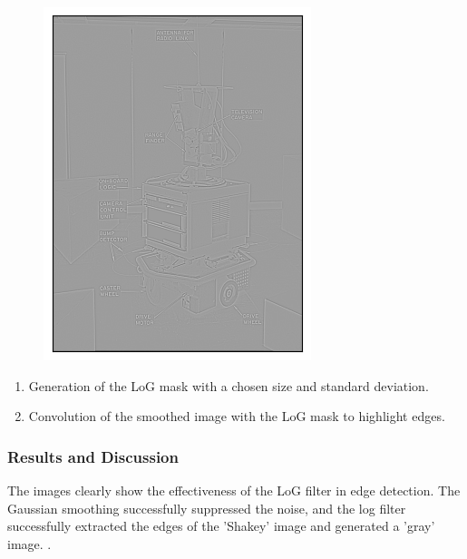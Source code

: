 \documentclass[11pt]{article}
\begin{document}
\begin{figure}[h]
\begin{minipage}{0.3\textwidth}
        \includegraphics[width=\textwidth]{../img/shakey_log_no_threshold.png}
    \end{minipage}\hfill
\end{figure}

\begin{enumerate}
    \item Generation of the LoG mask with a chosen size and standard deviation.
    \item Convolution of the smoothed image with the LoG mask to highlight edges.
\end{enumerate}

\subsubsection*{Results and Discussion}
The images clearly show the effectiveness of the LoG filter in edge detection. The Gaussian smoothing successfully suppressed the noise, and the log filter successfully extracted the edges of the 'Shakey' image and generated a 'gray' image. . 
\end{document}
